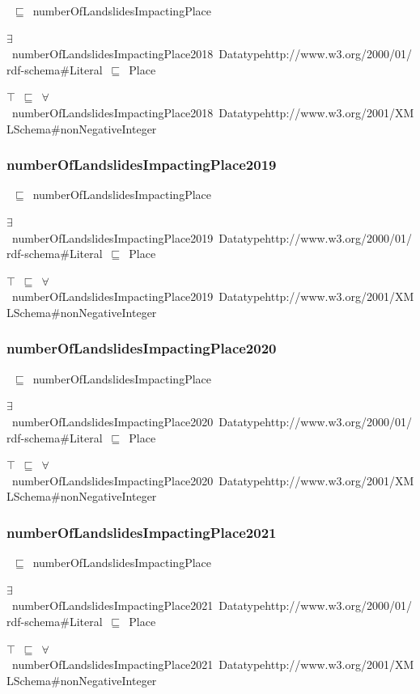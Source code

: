 \documentclass{article}
\begin{document}
~\ensuremath{\sqsubseteq}~numberOfLandslidesImpactingPlace

\ensuremath{\exists}~numberOfLandslidesImpactingPlace2018~Datatypehttp://www.w3.org/2000/01/rdf-schema#Literal~\ensuremath{\sqsubseteq}~Place

\ensuremath{\top}~\ensuremath{\sqsubseteq}~\ensuremath{\forall}~numberOfLandslidesImpactingPlace2018~Datatypehttp://www.w3.org/2001/XMLSchema#nonNegativeInteger

\subsubsection*{numberOfLandslidesImpactingPlace2019}

~\ensuremath{\sqsubseteq}~numberOfLandslidesImpactingPlace

\ensuremath{\exists}~numberOfLandslidesImpactingPlace2019~Datatypehttp://www.w3.org/2000/01/rdf-schema#Literal~\ensuremath{\sqsubseteq}~Place

\ensuremath{\top}~\ensuremath{\sqsubseteq}~\ensuremath{\forall}~numberOfLandslidesImpactingPlace2019~Datatypehttp://www.w3.org/2001/XMLSchema#nonNegativeInteger

\subsubsection*{numberOfLandslidesImpactingPlace2020}

~\ensuremath{\sqsubseteq}~numberOfLandslidesImpactingPlace

\ensuremath{\exists}~numberOfLandslidesImpactingPlace2020~Datatypehttp://www.w3.org/2000/01/rdf-schema#Literal~\ensuremath{\sqsubseteq}~Place

\ensuremath{\top}~\ensuremath{\sqsubseteq}~\ensuremath{\forall}~numberOfLandslidesImpactingPlace2020~Datatypehttp://www.w3.org/2001/XMLSchema#nonNegativeInteger

\subsubsection*{numberOfLandslidesImpactingPlace2021}

~\ensuremath{\sqsubseteq}~numberOfLandslidesImpactingPlace

\ensuremath{\exists}~numberOfLandslidesImpactingPlace2021~Datatypehttp://www.w3.org/2000/01/rdf-schema#Literal~\ensuremath{\sqsubseteq}~Place

\ensuremath{\top}~\ensuremath{\sqsubseteq}~\ensuremath{\forall}~numberOfLandslidesImpactingPlace2021~Datatypehttp://www.w3.org/2001/XMLSchema#nonNegativeInteger
\end{document}

